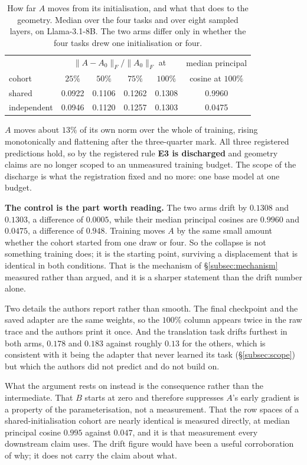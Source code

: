 \begin{table}[htb]
\centering
\small
\caption{How far $A$ moves from its initialisation, and what that does to the
geometry. Median over the four tasks and over eight sampled layers, on
Llama-3.1-8B. The two arms differ only in whether the four tasks drew one
initialisation or four.}
\label{tab:drift}
\begin{tabular}{lccccc}
\toprule
 & \multicolumn{4}{c}{$\|A - A_0\|_F/\|A_0\|_F$ at} &
   median principal \\
cohort & $25\%$ & $50\%$ & $75\%$ & $100\%$ & cosine at $100\%$ \\
\midrule
shared        & 0.0922 & 0.1106 & 0.1262 & 0.1308 & 0.9960 \\
independent   & 0.0946 & 0.1120 & 0.1257 & 0.1303 & 0.0475 \\
\bottomrule
\end{tabular}
\end{table}

$A$ moves about $13\%$ of its own norm over the whole of training, rising
monotonically and flattening after the three-quarter mark. All three
registered predictions hold, so by the registered rule \textbf{E3 is
discharged} and geometry claims are no longer scoped to an unmeasured training
budget. The scope of the discharge is what the registration fixed and no
more: one base model at one budget.

\textbf{The control is the part worth reading.} The two arms drift by
$0.1308$ and $0.1303$, a difference of $0.0005$, while their median principal
cosines are $0.9960$ and $0.0475$, a difference of $0.948$. Training moves $A$
by the same small amount whether the cohort started from one draw or four. So
the collapse is not something training does; it is the starting point,
surviving a displacement that is identical in both conditions. That is the
mechanism of \S\ref{subsec:mechanism} measured rather than argued, and it is a
sharper statement than the drift number alone.

Two details the authors report rather than smooth. The final checkpoint and the saved
adapter are the same weights, so the $100\%$ column appears twice in the raw
trace and the authors print it once. And the translation task drifts furthest in both
arms, $0.178$ and $0.183$ against roughly $0.13$ for the others, which is
consistent with it being the adapter that never learned its task
(\S\ref{subsec:scope}) but which the authors did not predict and do not build on.

What the argument rests on instead is the consequence rather than the
intermediate. That $B$ starts at zero and therefore suppresses $A$'s early
gradient is a property of the parameterisation, not a measurement. That the
row spaces of a shared-initialisation cohort are nearly identical is
measured directly, at median principal cosine $0.995$ against $0.047$, and
it is that measurement every downstream claim uses. The drift figure would
have been a useful corroboration of why; it does not carry the claim about
what.

